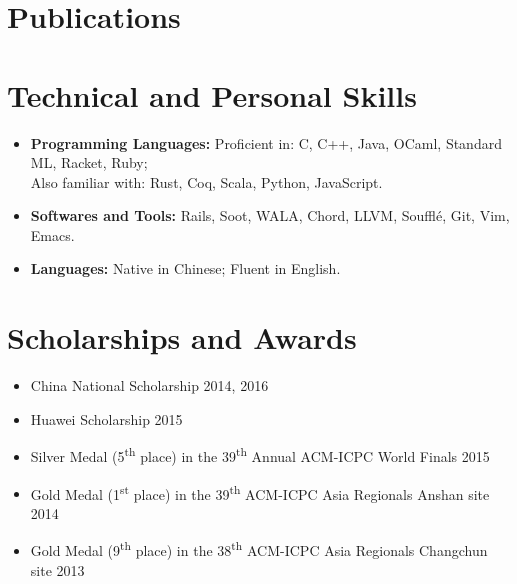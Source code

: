 \documentclass[11pt,letterpaper,roman]{moderncv}        %
\begin{document}
\section{Publications}
\vspace{2pt}

\section{Technical and Personal Skills}

\begin{itemize}

\item \textbf{Programming Languages:} Proficient in: C, C++, Java, OCaml, Standard ML, Racket, Ruby; \\ Also familiar with: Rust, Coq, Scala, Python, JavaScript.

\vspace{4pt}

\item \textbf{Softwares and Tools:} Rails, Soot, WALA, Chord, LLVM, Souffl{\'e}, Git, Vim, Emacs.

\vspace{4pt}

\item \textbf{Languages:} Native in Chinese; Fluent in English.

\end{itemize}

\section{Scholarships and Awards}

\begin{itemize}
\item China National Scholarship \hfill 2014, 2016
\item Huawei Scholarship \hfill 2015

	\vspace{4pt}

	\item Silver Medal (5\textsuperscript{th} place) in the 39\textsuperscript{th} Annual ACM-ICPC World Finals \hfill 2015
	\item Gold Medal (1\textsuperscript{st} place) in the 39\textsuperscript{th} ACM-ICPC Asia Regionals Anshan site \hfill 2014
	\item Gold Medal (9\textsuperscript{th} place) in the 38\textsuperscript{th} ACM-ICPC Asia Regionals Changchun site \hfill 2013
\end{itemize}
\end{document}
